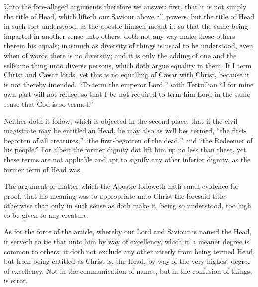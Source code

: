 Unto the fore-alleged arguments therefore we answer: first, that it is not simply the title of Head, which lifteth our Saviour above all powers, but the title of Head in such sort understood, as the apostle himself meant it: so that the same being imparted in another sense unto others, doth not any way make those others therein his equals; inasmuch as diversity of things is usual to be understood, even when of words there is no diversity; and it is only the adding of one and the selfsame thing unto diverse persons, which doth argue equality in them. If I term Christ and Cæsar lords, yet this is no equalling of Cæsar with Christ, because it is not  thereby intended. “To term the emperor Lord,” saith Tertullian “I for mine own part will not refuse, so that I be not required to term him Lord in the same sense that God is so termed.”

Neither doth it follow, which is objected in the second place, that if the civil magistrate may be entitled an Head, he may also as well bes termed, “the first-begotten of all creatures,” “the first-begotten of the dead,” and “the Redeemer of his people.” For albeit the former dignity dot lift him up no less than these, yet these terms are not appliable and apt to signify any other inferior dignity, as the former term of Head was.

The argument or matter which the Apostle followeth hath small evidence for proof, that his meaning was to appropriate unto Christ the foresaid title, otherwise than only in such sense as doth make it, being so understood, too high to be given to any creature.

As for the force of the article, whereby our Lord and Saviour is named the Head, it serveth to tie that unto him by way of excellency, which in a meaner degree is common to others; it doth not exclude any other utterly from being termed Head, but from being entitled as Christ is, the Head, by way of the very highest degree of excellency. Not in the communication of names, but in the confusion of things, is error.

